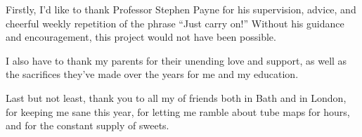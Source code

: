 Firstly, I'd like to thank Professor Stephen Payne for his supervision, advice, and cheerful weekly repetition of the phrase ``Just carry on!'' Without his guidance and encouragement, this project would not have been possible. 

I also have to thank my parents for their unending love and support, as well as the sacrifices they've made over the years for me and my education.

Last but not least, thank you to all my of friends both in Bath and in London, for keeping me sane this year, for letting me ramble about tube maps for hours, and for the constant supply of sweets.
